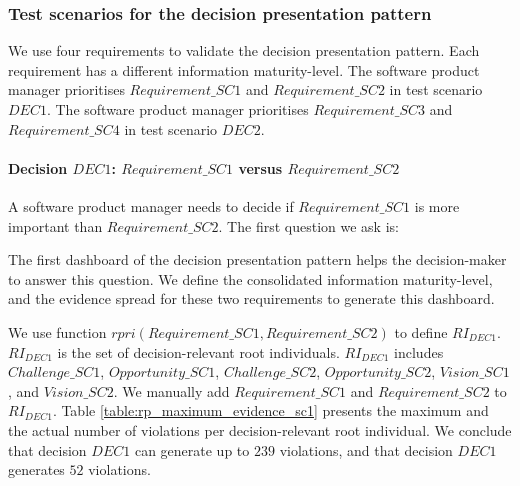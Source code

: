 \subsubsection{Test scenarios for the decision presentation pattern}
We use four requirements to validate the decision presentation pattern. Each requirement has a different information maturity-level. The software product manager prioritises $Requirement\_SC1$ and $Requirement\_SC2$ in test scenario $DEC1$. The software product manager prioritises $Requirement\_SC3$ and $Requirement\_SC4$ in test scenario $DEC2$.


\paragraph{Decision $DEC1$: $Requirement\_SC1$ versus $Requirement\_SC2$}
A software product manager needs to decide if $Requirement\_SC1$ is more important than $Requirement\_SC2$. The first question we ask is:

\begin{center}
\large\color{document}{Is the information ready for an evidence-based decision?}
\end{center}

The first dashboard of the decision presentation pattern helps the decision-maker to answer this question. We define the consolidated information maturity-level, and the evidence spread for these two requirements to generate this dashboard. 

We use function $rpri(Requirement\_SC1,Requirement\_SC2)$ to define $RI_{DEC1}$. $RI_{DEC1}$ is the set of decision-relevant root individuals. $RI_{DEC1}$ includes $Challenge\_SC1$, $Opportunity\_SC1$, $Challenge\_SC2$, $Opportunity\_SC2$, $Vision\_SC1$, and $Vision\_SC2$. We manually add $Requirement\_SC1$ and $Requirement\_SC2$ to $RI_{DEC1}$. Table \ref{table:rp_maximum_evidence_sc1} presents the maximum and the actual number of violations per decision-relevant root individual. We conclude that decision $DEC1$ can generate up to $239$ violations, and that decision $DEC1$ generates $52$ violations.

